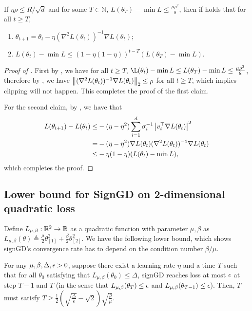 \begin{lemma}\label{lem:2nd_phase_convex}
	If $\eta\rho\le R/\sqrt{d}$ and for some $T\in\mathbb{N}$, $L(\theta_T)-\min L\le \frac{\mu\rho^2}{8}$, then if holds that for all $t\ge T$, 
	\begin{enumerate}
		\item $\theta_{t+1} = \theta_t - \eta (\nabla^2 L(\theta_t))^{-1}\nabla L(\theta_t)$;
		\item $L(\theta_t)-\min L \le (1-\eta(1-\eta))^{t-T}(L(\theta_T)-\min L)$.
	\end{enumerate}
\end{lemma}
\begin{proof}[Proof of ]
	First by , we have for all $t\ge T$, $\L(\theta_t) - \min L\le L(\theta_T)-\min L\le \frac{\mu\rho^2}{8}$, therefore by , we have $ \left\|(\nabla^2 L(\theta_t))^{-1}\nabla L(\theta_t)\right\|_2 \le \rho$ for all $t\ge T$, which implies clipping will not happen. This completes the proof of the first claim.
	
	For the second claim, by , we have that 
	\begin{align}
		L(\theta_{t+1}) - L(\theta_t)
		\le& -(\eta-\eta^2)\sum_{i=1}^d \sigma_i^{-1}\left| v_i^\top \nabla L(\theta_t) \right|^2 \\
		= &-(\eta-\eta^2)\nabla L(\theta_t) (\nabla^2 L(\theta_t))^{-1}\nabla L(\theta_t)\\
		\le & - \eta(1-\eta)( L(\theta_t)-\min L),
	\end{align}
which completes the proof.
\end{proof}

\newcommand{\nL}{L_{\mu,\beta}}
\subsection{Lower bound for SignGD on 2-dimensional quadratic loss} \label{sec:proofs:lowbound}

Define $L_{\mu,\beta}:\mathbb{R}^2\to\mathbb{R}$ as a quadratic function with parameter $\mu,\beta$ as $L_{\mu,\beta}(\theta)\triangleq \frac{\mu}{2}\theta_{[1]}^2 + \frac{\beta}{2}\theta_{[2]}^2$.  We have the following lower bound, which shows signGD's convergence rate has to depend on the condition number $\beta/\mu$. 
\begin{theorem}\label{thm:signgd_lower_bound}
    For any $\mu,\beta,\Delta,\epsilon>0$, suppose there exist a learning rate $\eta$ and a time $T$ such that for all $\theta_0$ satisfying that $L_{\mu,\beta}(\theta_0)\le \Delta$, signGD reaches loss at most $\epsilon$ at step $T-1$ and $T$ (in the sense that $\nL(\theta_{T})\le \eps$ and $\nL(\theta_{T-1})\le \eps$). Then, $T$ must satisfy $T\ge \frac{1}{2}(\sqrt{\frac{\Delta}{\epsilon}}-\sqrt{2})\sqrt{\frac{\beta}{\mu}}$.
\end{theorem}

